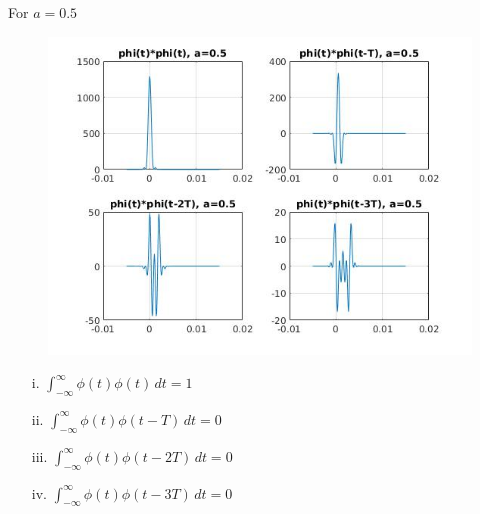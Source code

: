 \documentclass[12pt, a4paper]{article}
\begin{document}
\begin{enumerate}
\pagebreak
For $a=0.5$
\begin{figure}[H]
\centering
\noindent\includegraphics[width=\textwidth]{phi_k_a2.jpg}
\end{figure}
\begin{enumerate}
\item[i.] $\int_{-\infty}^{\infty} \phi(t)\phi(t) \,dt = 1$
\item[ii.] $\int_{-\infty}^{\infty} \phi(t)\phi(t-T) \,dt = 0$
\item[iii.] $\int_{-\infty}^{\infty} \phi(t)\phi(t-2T) \,dt = 0$
\item[iv.] $\int_{-\infty}^{\infty} \phi(t)\phi(t-3T) \,dt = 0$
\end{enumerate}


\end{enumerate}
\end{document}
